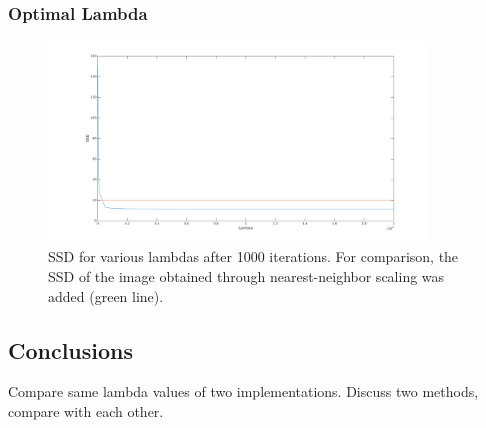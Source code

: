 \documentclass{paper}
\begin{document}
\subsubsection*{Optimal Lambda}
\begin{figure}[ht!]%
\centering
\includegraphics[width=0.9\textwidth]{lambda_vs_ssd.png}
\caption{SSD for various lambdas after 1000 iterations. For comparison, the
SSD of the image obtained through nearest-neighbor scaling was added (green line).}
\label{fig:lambda_vs_ssd}
\end{figure}

\subsection*{Conclusions}
Compare same lambda values of two implementations.
Discuss two methods, compare with each other.
\end{document}
